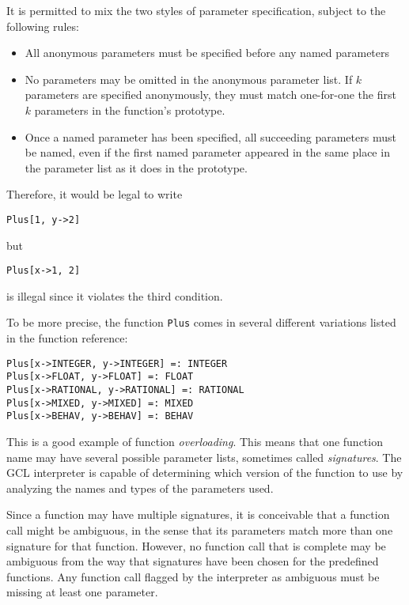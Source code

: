 It is permitted to mix the two styles of parameter specification, subject
to the following rules:

\begin{itemize}
\item All anonymous parameters must be specified before any named parameters
\item No parameters may be omitted in the anonymous parameter list.  If
$k$ parameters are specified anonymously, they must match one-for-one the
first $k$ parameters in the function's prototype.
\item Once a named parameter has been specified, all succeeding parameters
must be named, even if the first named parameter appeared in the same
place in the parameter list as it does in the prototype.
\end{itemize}

\noindent Therefore, it would be legal to write

\begin{verbatim}
Plus[1, y->2]
\end{verbatim}

\noindent but

\begin{verbatim}
Plus[x->1, 2]
\end{verbatim}

\noindent is illegal since it violates the third condition.

To be more precise, the function {\tt Plus} comes in several different
variations listed in the function reference:

\begin{verbatim}
Plus[x->INTEGER, y->INTEGER] =: INTEGER
Plus[x->FLOAT, y->FLOAT] =: FLOAT
Plus[x->RATIONAL, y->RATIONAL] =: RATIONAL
Plus[x->MIXED, y->MIXED] =: MIXED
Plus[x->BEHAV, y->BEHAV] =: BEHAV
\end{verbatim}

\noindent This is a good example of function {\it overloading}.  This
means that one function name may have several possible parameter
lists, sometimes called {\it signatures}.  The GCL interpreter is
capable of determining which version of the function to use by
analyzing the names and types of the parameters used.

Since a function may have multiple signatures, it is conceivable that
a function call might be ambiguous, in the sense that its parameters match
more than one signature for that function.  However, no function call that
is complete may be ambiguous from the way that signatures have been
chosen for the predefined functions.  Any function call flagged by the
interpreter as ambiguous must be missing at least one parameter.

